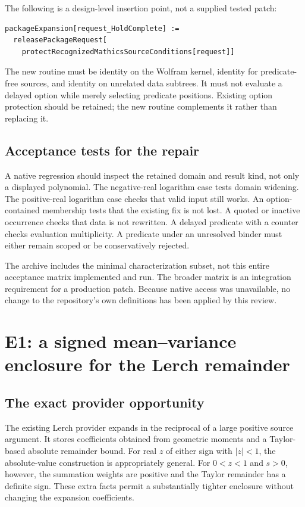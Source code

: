 \documentclass[11pt,a4paper]{article}
\begin{document}
The following is a design-level insertion point, not a supplied tested patch:
\begin{lstlisting}
packageExpansion[request_HoldComplete] :=
  releasePackageRequest[
    protectRecognizedMathicsSourceConditions[request]]
\end{lstlisting}
The new routine must be identity on the Wolfram kernel, identity for predicate-free sources, and identity on unrelated data subtrees. It must not evaluate a delayed option while merely selecting predicate positions. Existing option protection should be retained; the new routine complements it rather than replacing it.

\subsection{Acceptance tests for the repair}
A native regression should inspect the retained domain and result kind, not only a displayed polynomial. The negative-real logarithm case tests domain widening. The positive-real logarithm case checks that valid input still works. An option-contained membership tests that the existing fix is not lost. A quoted or inactive occurrence checks that data is not rewritten. A delayed predicate with a counter checks evaluation multiplicity. A predicate under an unresolved binder must either remain scoped or be conservatively rejected.

The archive includes the minimal characterization subset, not this entire acceptance matrix implemented and run. The broader matrix is an integration requirement for a production patch. Because native access was unavailable, no change to the repository's own definitions has been applied by this review.

\section{E1: a signed mean--variance enclosure for the Lerch remainder}\label{sec:lerch}

\subsection{The exact provider opportunity}
The existing Lerch provider expands in the reciprocal of a large positive source argument. It stores coefficients obtained from geometric moments and a Taylor-based absolute remainder bound. For real $z$ of either sign with $|z|<1$, the absolute-value construction is appropriately general. For $0<z<1$ and $s>0$, however, the summation weights are positive and the Taylor remainder has a definite sign. These extra facts permit a substantially tighter enclosure without changing the expansion coefficients.\cite{dirichlet}
\end{document}
